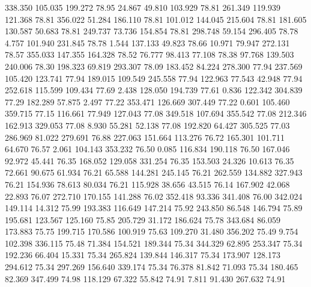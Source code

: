  338.350  105.035  199.272        78.95
  24.867   49.810  103.929        78.81
 261.349  119.939  121.368        78.81
 356.022   51.284  186.110        78.81
 101.012  144.045  215.604        78.81
 181.605  130.587   50.683        78.81
 249.737   73.736  154.854        78.81
 298.748   59.154  296.405        78.78
   4.757  101.940  231.845        78.78
   1.544  137.133   49.823        78.66
  10.971   79.947  272.131        78.57
 355.033  147.355  164.328        78.52
  76.777   98.413   77.108        78.38
  97.768  139.503  240.006        78.30
 198.323   69.819  293.307        78.09
 183.452   84.224  278.300        77.94
 237.569  105.420  123.741        77.94
 189.015  109.549  245.558        77.94
 122.963   77.543   42.948        77.94
 252.618  115.599  109.434        77.69
   2.438  128.050  194.739        77.61
   0.836  122.342  304.839        77.29
 182.289   57.875    2.497        77.22
 353.471  126.669  307.449        77.22
   0.601  105.460  359.715        77.15
 116.661   77.949  127.043        77.08
 349.518  107.694  355.542        77.08
 212.346  162.913  329.053        77.08
   8.930   55.281   52.138        77.08
 192.820   64.427  305.525        77.03
 286.969   81.022  279.691        76.88
 227.063  151.664  113.276        76.72
 165.301  101.711   64.670        76.57
   2.061  104.143  353.232        76.50
   0.085  116.834  190.118        76.50
 167.046   92.972   45.441        76.35
 168.052  129.058  331.254        76.35
 153.503   24.326   10.613        76.35
  72.661   90.675   61.934        76.21
  65.588  144.281  245.145        76.21
 262.559  134.882  327.943        76.21
 154.936   78.613   80.034        76.21
 115.928   38.656   43.515        76.14
 167.902   42.068   22.893        76.07
 272.710  170.155  141.288        76.02
 352.418   93.336  341.408        76.00
 342.024  149.114   14.312        75.99
 193.383  116.649  147.214        75.92
 243.850   86.548  146.794        75.89
 195.681  123.567  125.160        75.85
 205.729   31.172  186.624        75.78
 343.684   86.059  173.883        75.75
 199.715  170.586  100.919        75.63
 109.270   31.480  356.202        75.49
   9.754  102.398  336.115        75.48
  71.384  154.521  189.344        75.34
 344.329   62.895  253.347        75.34
 192.236   66.404   15.331        75.34
 265.824  139.844  146.317        75.34
 173.907  128.173  294.612        75.34
 297.269  156.640  339.174        75.34
  76.378   81.842   71.093        75.34
 180.465   82.369  347.499        74.98
 118.129   67.322   55.842        74.91
   7.811   91.430  267.632        74.91
